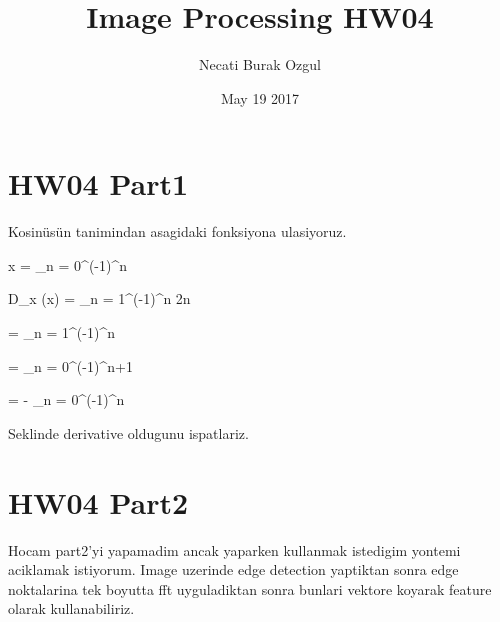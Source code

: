 \documentclass[12pt]{article}
\title{Image Processing HW04}
\author{Necati Burak Ozgul}
\date{May 19 2017}
\begin{document}
\maketitle

\section{HW04 Part1 }


Kosinüsün tanimindan asagidaki fonksiyona ulasiyoruz.

\displaystyle \cos x = \sum_{n \mathop = 0}^\infty \left({-1}\right)^n 

\displaystyle D_x \left({\cos x}\right) = \sum_{n \mathop = 1}^\infty \left({-1}\right)^n 2n 
 
\displaystyle = \sum_{n \mathop = 1}^\infty \left({-1}\right)^n 

\displaystyle = \sum_{n \mathop = 0}^\infty \left({-1}\right)^{n+1} 

\displaystyle = - \sum_{n \mathop = 0}^\infty \left({-1}\right)^n 

Seklinde derivative oldugunu ispatlariz.

\section{HW04 Part2 }

Hocam part2'yi yapamadim ancak yaparken kullanmak istedigim yontemi aciklamak istiyorum. Image uzerinde edge detection yaptiktan sonra edge noktalarina tek boyutta fft uyguladiktan sonra bunlari vektore koyarak feature olarak kullanabiliriz. 
\end{document}
